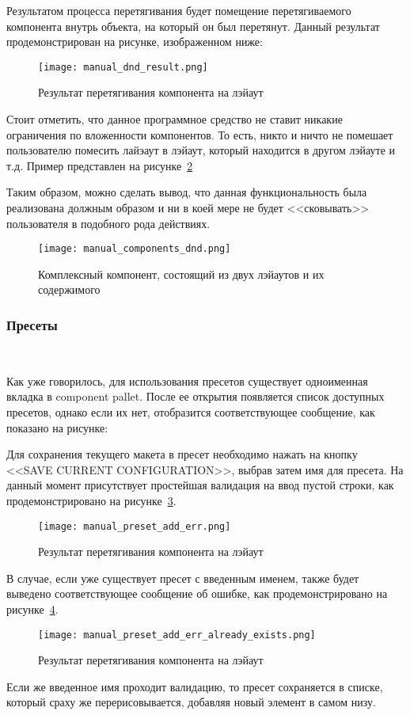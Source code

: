 Результатом процесса перетягивания будет помещение перетягиваемого компонента внутрь объекта, на который он был перетянут. Данный результат продемонстрирован на рисунке, изображенном ниже:

\begin{figure}[ht]
  \centering
    \texttt{[image: manual\_dnd\_result.png]}
    \caption{Результат перетягивания компонента на лэйаут}
    \label{sec:manual:manual_dnd_result}
\end{figure}

Стоит отметить, что данное программное средство не ставит никакие ограничения по вложенности компонентов. То есть, никто и ничто не помешает пользователю помесить лайэаут в лэйаут, который находится в другом лэйауте и т.д. Пример представлен на рисунке~\ref{sec:manual:manual_components_dnd}

Таким образом, можно сделать вывод, что данная функциональность была реализована должным образом и ни в коей мере не будет <<сковывать>> пользователя в подобного рода действиях.

\begin{figure}[ht]
  \centering
    \texttt{[image: manual\_components\_dnd.png]}
    \caption{Комплексный компонент, состоящий из двух лэйаутов и их содержимого}
    \label{sec:manual:manual_components_dnd}
\end{figure}

\subsubsection{Пресеты}
\

Как уже говорилось, для использования пресетов существует одноименная вкладка в component pallet. После ее открытия появляется список доступных пресетов, однако если их нет, отобразится соответствующее сообщение, как показано на рисунке:


Для сохранения текущего макета в пресет необходимо нажать на кнопку <<SAVE CURRENT CONFIGURATION>>, выбрав затем имя для пресета. На данный момент присутствует простейшая валидация на ввод пустой строки, как продемонстрировано на рисунке~\ref{sec:manual:manual_preset_add_err}.

\begin{figure}[ht]
  \centering
    \texttt{[image: manual\_preset\_add\_err.png]}
    \caption{Результат перетягивания компонента на лэйаут}
    \label{sec:manual:manual_preset_add_err}
\end{figure}

В случае, если уже существует пресет с введенным именем, также будет выведено соответствующее сообщение об ошибке, как продемонстрировано на рисунке~\ref{sec:manual:manual_preset_add_err_already_exists}.

\begin{figure}[ht]
  \centering
    \texttt{[image: manual\_preset\_add\_err\_already\_exists.png]}
    \caption{Результат перетягивания компонента на лэйаут}
    \label{sec:manual:manual_preset_add_err_already_exists}
\end{figure}

Если же введенное имя проходит валидацию, то пресет сохраняется в списке, который сраху же перерисовывается, добавляя новый элемент в самом низу.